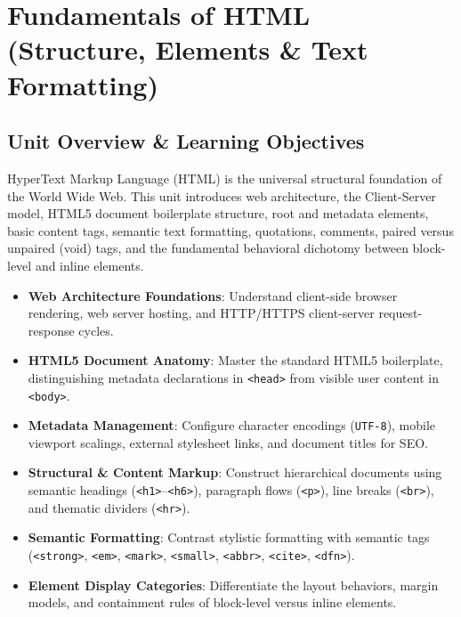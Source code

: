\chapter{Fundamentals of HTML (Structure, Elements \& Text Formatting)}
\label{chap:fundamentals-of-html}

\section{Unit Overview \& Learning Objectives}

\begin{conceptbox}
HyperText Markup Language (HTML) is the universal structural foundation of the World Wide Web. This unit introduces web architecture, the Client-Server model, HTML5 document boilerplate structure, root and metadata elements, basic content tags, semantic text formatting, quotations, comments, paired versus unpaired (void) tags, and the fundamental behavioral dichotomy between block-level and inline elements.
\end{conceptbox}

\begin{itemize}[leftmargin=1.5em]
    \item \textbf{Web Architecture Foundations}: Understand client-side browser rendering, web server hosting, and HTTP/HTTPS client-server request-response cycles.
    \item \textbf{HTML5 Document Anatomy}: Master the standard HTML5 boilerplate, distinguishing metadata declarations in \texttt{<head>} from visible user content in \texttt{<body>}.
    \item \textbf{Metadata Management}: Configure character encodings (\texttt{UTF-8}), mobile viewport scalings, external stylesheet links, and document titles for SEO.
    \item \textbf{Structural \& Content Markup}: Construct hierarchical documents using semantic headings (\texttt{<h1>}--\texttt{<h6>}), paragraph flows (\texttt{<p>}), line breaks (\texttt{<br>}), and thematic dividers (\texttt{<hr>}).
    \item \textbf{Semantic Formatting}: Contrast stylistic formatting with semantic tags (\texttt{<strong>}, \texttt{<em>}, \texttt{<mark>}, \texttt{<small>}, \texttt{<abbr>}, \texttt{<cite>}, \texttt{<dfn>}).
    \item \textbf{Element Display Categories}: Differentiate the layout behaviors, margin models, and containment rules of block-level versus inline elements.
\end{itemize}

